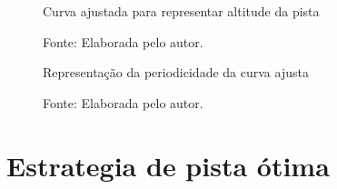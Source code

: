 \begin{figure}[H]
    \centering
    \caption{Curva ajustada para representar altitude da pista}
    
    \label{graf:modelo_pista}
    \caption*{\footnotesize{Fonte: Elaborada pelo autor.}}
\end{figure}

\begin{figure}[H]
    \centering
    \caption{Representação da periodicidade da curva ajusta}
    
    \label{graf:pista_voltas}
    \caption*{\footnotesize{Fonte: Elaborada pelo autor.}}
\end{figure}

\section{Estrategia de pista ótima}
\label{sec:resultados_otimo}

\clearpage